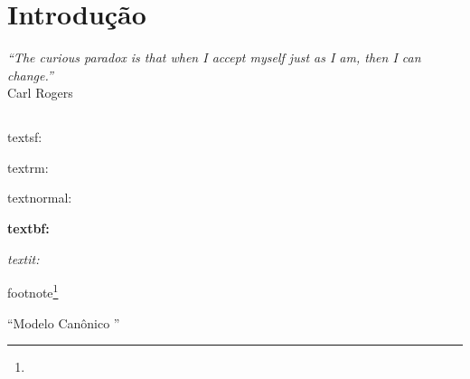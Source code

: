 

\cleardoublepage
{} %



\chapter[Introdução]{Introdução \showfont}




\begin{flushright}
    \textit{``The curious paradox is that when I accept myself just as I am, then I can change.''}\\
    Carl Rogers
\end{flushright}




\newpage


\section[Some encoding tests]{\showfont}
\subsection{\showfont}
\subsubsection{\showfont}
\subsubsubsection{\showfont}


\textsf{textsf: \showfont}

\textrm{textrm: \showfont}

\textnormal{textnormal: \showfont}

\sloppy
\textbf{textbf: \showfont}
\fussy

\textit{textit: \showfont}

footnote\footnote{\showfont}


``Modelo Canônico \showfont''

